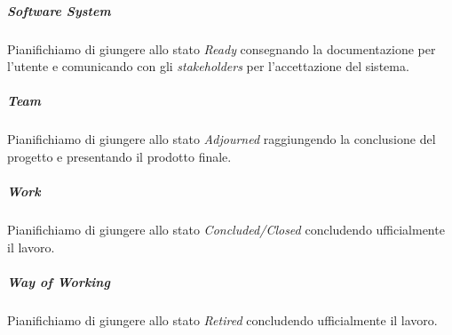 	\subparagraph{Software System}
	Pianifichiamo di giungere allo stato \emph{Ready} consegnando la documentazione per l'utente e comunicando con gli \emph{stakeholders} per l'accettazione del sistema.
	
	\subparagraph{Team}
	Pianifichiamo di giungere allo stato \emph{Adjourned} raggiungendo la conclusione del progetto e presentando il prodotto finale.
	
	\subparagraph{Work}
	Pianifichiamo di giungere allo stato \emph{Concluded/Closed} concludendo ufficialmente il lavoro.
	
	\subparagraph{Way of Working}
	Pianifichiamo di giungere allo stato \emph{Retired} concludendo ufficialmente il lavoro.

	\newpage